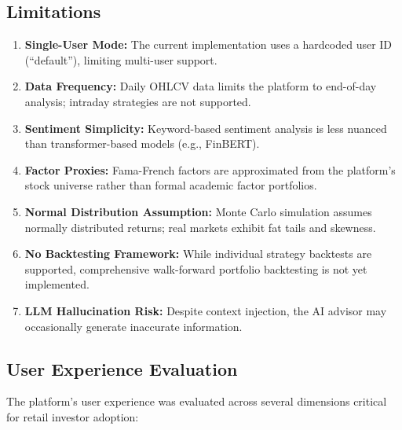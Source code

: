 \documentclass[12pt, a4paper, oneside]{report}
\begin{document}
\subsection{Limitations}

\begin{enumerate}[nosep]
    \item \textbf{Single-User Mode:} The current implementation uses a hardcoded user ID (``default''), limiting multi-user support.
    \item \textbf{Data Frequency:} Daily OHLCV data limits the platform to end-of-day analysis; intraday strategies are not supported.
    \item \textbf{Sentiment Simplicity:} Keyword-based sentiment analysis is less nuanced than transformer-based models (e.g., FinBERT).
    \item \textbf{Factor Proxies:} Fama-French factors are approximated from the platform's stock universe rather than formal academic factor portfolios.
    \item \textbf{Normal Distribution Assumption:} Monte Carlo simulation assumes normally distributed returns; real markets exhibit fat tails and skewness.
    \item \textbf{No Backtesting Framework:} While individual strategy backtests are supported, comprehensive walk-forward portfolio backtesting is not yet implemented.
    \item \textbf{LLM Hallucination Risk:} Despite context injection, the AI advisor may occasionally generate inaccurate information.
\end{enumerate}

\subsection{User Experience Evaluation}

The platform's user experience was evaluated across several dimensions critical for retail investor adoption:
\end{document}
